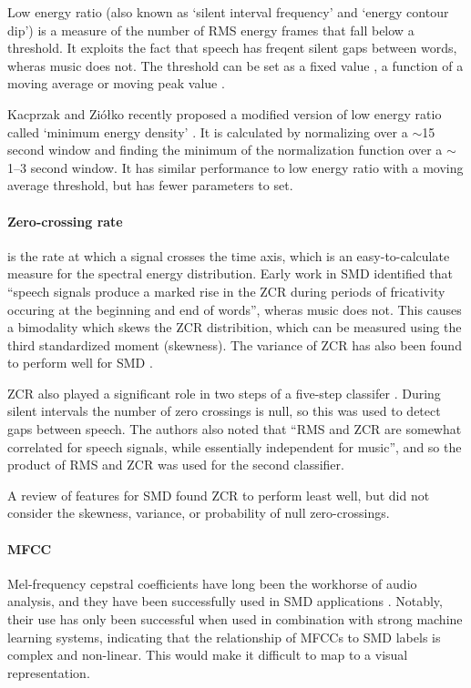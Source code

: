 Low energy ratio (also known as `silent interval frequency' and `energy contour
dip') is a measure of the number of RMS energy frames that fall below a
threshold. It exploits the fact that speech has freqent silent gaps between
words, wheras music does not. The threshold can be set as a fixed value
\cite{Liang2005}, a function of a moving average \cite{Ericsson2009} or moving
peak value \cite{Saunders1996}.

Kacprzak and Zi\'{o}\l{}ko recently proposed a modified version of low energy
ratio called `minimum energy density' \cite{Kacprzak2013}. It is calculated by
normalizing over a $\sim$15 second window and finding the minimum of the
normalization function over a $\sim$1--3 second window. It has similar
performance to low energy ratio with a moving average threshold, but has fewer
parameters to set.

\paragraph{Zero-crossing rate} is the rate at which a signal crosses the time
axis, which is an easy-to-calculate measure for the spectral energy
distribution. Early work in SMD \cite{Saunders1996} identified that ``speech
signals produce a marked rise in the ZCR during periods of fricativity occuring
at the beginning and end of words'', wheras music does not. This causes a
bimodality which skews the ZCR distribition, which can be measured using the
third standardized moment (skewness). The variance of ZCR has also been found
to perform well for SMD \cite{Scheirer1997}.

ZCR also played a significant role in two steps of a five-step classifer
\cite{Panagiotakis2005}. During silent intervals the number of zero crossings
is null, so this was used to detect gaps between speech. The authors also noted
that ``RMS and ZCR are somewhat correlated for speech signals, while
essentially independent for music'', and so the product of RMS and ZCR was used
for the second classifier.

A review \cite{Carey1999} of features for SMD found ZCR to perform least well,
but did not consider the skewness, variance, or probability of null
zero-crossings.

\paragraph{MFCC}
Mel-frequency cepstral coefficients have long been the workhorse of audio
analysis, and they have been successfully used in SMD applications
\cite{Carey1999,Liang2005,Pikrakis2008,Pikrakis2006a,Sell2014,Wieser2014}.
Notably, their use has only been successful when used in combination with
strong machine learning systems, indicating that the relationship of MFCCs to
SMD labels is complex and non-linear. This would make it difficult to map to a
visual representation.

